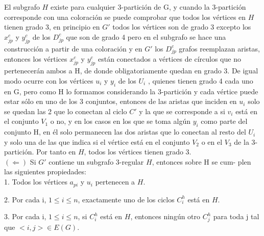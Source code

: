 \documentclass[
10pt, %
a4paper, %
oneside, %
headinclude,footinclude, %
BCOR5mm, %
]{scrartcl}
\begin{document}
El subgrafo $H$ existe para cualquier 3-partición de G, y cuando la 3-partición corresponde con una coloración se puede comprobar que todos los vértices en
$H$ tienen grado 3, en principio en $G'$ todos los vértices son de grado 3 excepto los $x_{jp}^{c}$ y $y_{jp}^{c}$ de los $D_{jp}^{c}$ que son de grado 4 pero en el subgrafo se hace 
una construcción a partir de una coloración y en $G'$ los $D_{jp}^{c}$ grafos reemplazan aristas, entonces los vértices $x_{jp}^{c}$ y $y_{jp}^{c}$ están conectados a vértices de círculos que
no pertenecerán ambos a H, de donde obligatoriamente quedan en grado 3. De
igual modo ocurre con los vértices $u_i$ y $y_i$ de los $U_i$ , quienes tienen grado 4 cada uno en G, pero como H lo formamos considerando la 3-partición y cada vértice
puede estar sólo en uno de los 3 conjuntos, entonces de las aristas que inciden
en $u_i$ solo se quedan las 2 que lo conectan al ciclo $C'$ y la que se corresponde a
si $v_i$ está en el conjunto $V_1$ o no, y en los casos en los que se toma algún $y_i$ como
parte del conjunto H, en él solo permanecen las dos aristas que lo conectan
al resto del $U_i$ y solo una de las que indica si el vértice está en el conjunto $V_2$
o en el $V_3$ de la 3-partición. Por tanto en $H$, todos los vértices tienen grado 3. \\


$(\Leftarrow )$ Si $G'$ contiene un subgrafo 3-regular $H$, entonces sobre H se cum-
plen las siguientes propiedades: \\


1. Todos los vértices $a_{pi}$ y $u_i$ pertenecen a $H$.

2. Por cada i, $1 \leq i \leq n$, exactamente uno de los ciclos $C^h_i$ está en $H$.

3. Por cada i, $1 \leq i \leq n$, si $C^h_i$ está en $H$, entonces ningún otro $C^h_j$ para
toda j tal que $< i, j > \in E(G)$. \\
\end{document}
